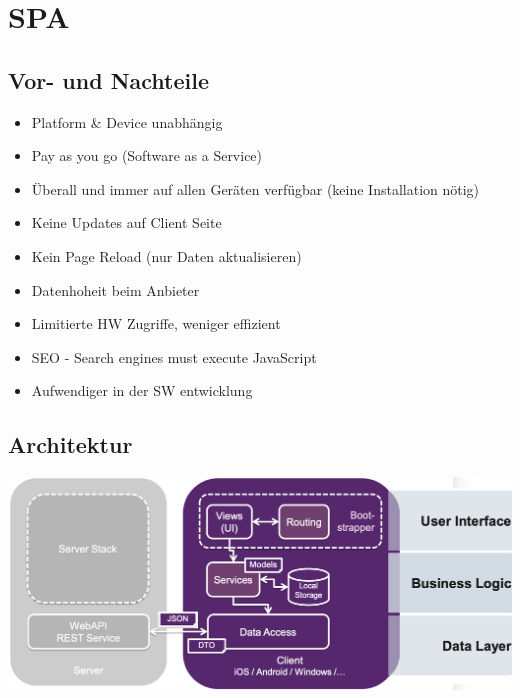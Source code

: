 


\section{SPA}




\subsection{Vor- und Nachteile}
\begin{itemize}[label={\textcolor{darkGreen}{+}}]
    \item Platform \& Device unabhängig
    \item Pay as you go (Software as a Service)
    \item Überall und immer auf allen Geräten verfügbar (keine Installation nötig)
    \item Keine Updates auf Client Seite
    \item Kein Page Reload (nur Daten aktualisieren)
\end{itemize}
\begin{itemize}[label={\textcolor{red}{--}}]
    \item Datenhoheit beim Anbieter
    \item Limitierte HW Zugriffe, weniger effizient
    \item SEO - Search engines must execute JavaScript
    \item Aufwendiger in der SW entwicklung
\end{itemize}

\subsection{Architektur}
\begin{center}
    \vspace{-5pt}
    \includegraphics[width=1.02\linewidth]{./img/01-spa/architecture_layers}
    \vspace{-17pt}
\end{center}

